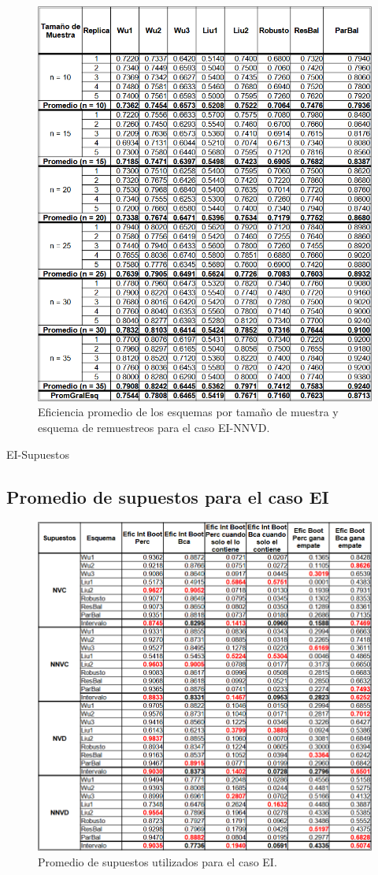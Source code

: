 \begin{figure}[ht] 
	\centering 
	\includegraphics[width=0.9\linewidth]{img/EI_NNVD_Efic_Esq.png} 
	\caption{Eficiencia promedio de los esquemas por tamaño de muestra y esquema de remuestreos para el caso EI-NNVD.} 
	\label{fig:EI_NNVD_Esq}
\end{figure}

EI-Supuestos
\subsection{Promedio de supuestos para el caso EI}

\begin{figure}[ht] 
	\centering 
	\includegraphics[width=0.8\linewidth]{img/EI_Prom_Supuestos.png} 
	\caption{Promedio de supuestos utilizados para el caso EI.} 
	\label{fig:EI_Supuestos}
\end{figure}


